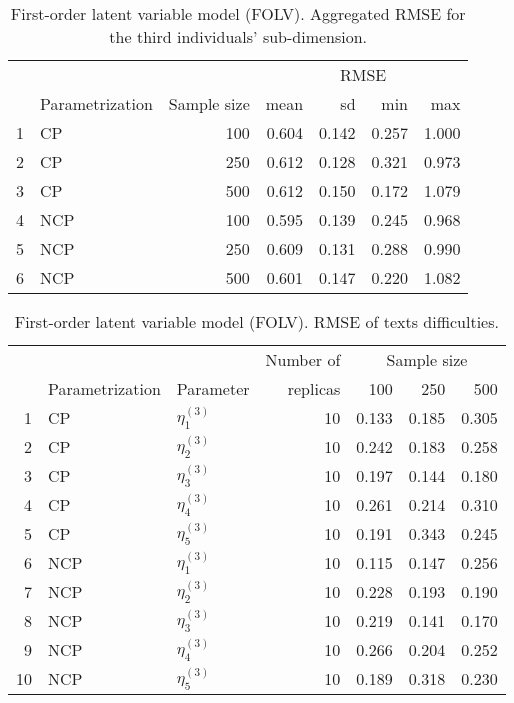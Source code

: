 %
\begin{table}[H]
	\centering
	\begin{tabular}{rlrrrrr}
		\hline
		\multicolumn{3}{c}{ } &\multicolumn{4}{c}{ RMSE } \\ 
		\cmidrule(rl){4-7}
		& Parametrization & Sample size & mean & sd & min & max \\  
		\hline\hline
		1 & CP &  100 & 0.604 & 0.142 & 0.257 & 1.000 \\  
		2 & CP &  250 & 0.612 & 0.128 & 0.321 & 0.973 \\  
		3 & CP &  500 & 0.612 & 0.150 & 0.172 & 1.079 \\ 
		\hline
		4 & NCP &  100 & 0.595 & 0.139 & 0.245 & 0.968 \\  
		5 & NCP &  250 & 0.609 & 0.131 & 0.288 & 0.990 \\ 
		6 & NCP &  500 & 0.601 & 0.147 & 0.220 & 1.082 \\  
		\hline
	\end{tabular}
	\caption[First-order latent variable model (FOLV). Aggregated RMSE for the third individuals' sub-dimension.]%
	{First-order latent variable model (FOLV). Aggregated RMSE for the third individuals' sub-dimension.}
	\label{tab:FOLV_RMSE_theta3}
\end{table}
%
\begin{table}[H]
	\centering
	\begin{tabular}{rllrrrr}
		\hline
		\multicolumn{3}{c}{ } & Number of &\multicolumn{3}{c}{ Sample size } \\ 
		\cmidrule(rl){5-7}
		& Parametrization & Parameter & replicas & 100 & 250 & 500 \\  
		\hline\hline
		1 & CP & $\eta^{(3)}_{1}$ &   10 & 0.133 & 0.185 & 0.305 \\ 
		2 & CP & $\eta^{(3)}_{2}$ &   10 & 0.242 & 0.183 & 0.258 \\ 
		3 & CP & $\eta^{(3)}_{3}$ &   10 & 0.197 & 0.144 & 0.180 \\ 
		4 & CP & $\eta^{(3)}_{4}$ &   10 & 0.261 & 0.214 & 0.310 \\ 
		5 & CP & $\eta^{(3)}_{5}$ &   10 & 0.191 & 0.343 & 0.245 \\ 
		\hline
		6 & NCP & $\eta^{(3)}_{1}$ &   10 & 0.115 & 0.147 & 0.256 \\ 
		7 & NCP & $\eta^{(3)}_{2}$ &   10 & 0.228 & 0.193 & 0.190 \\ 
		8 & NCP & $\eta^{(3)}_{3}$ &   10 & 0.219 & 0.141 & 0.170 \\ 
		9 & NCP & $\eta^{(3)}_{4}$ &   10 & 0.266 & 0.204 & 0.252 \\ 
		10 & NCP & $\eta^{(3)}_{5}$ &   10 & 0.189 & 0.318 & 0.230 \\ 
		\hline
	\end{tabular}
	\caption[First-order latent variable model (FOLV). RMSE of texts difficulties.]%
	{First-order latent variable model (FOLV). RMSE of texts difficulties.}
	\label{tab:FOLV_RMSE_texts_diff}
\end{table}
